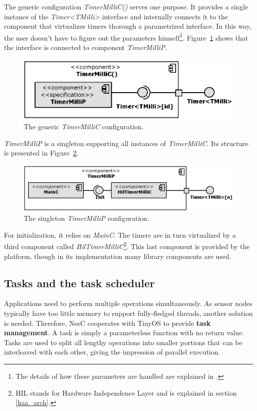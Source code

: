 The generic configuration \emph{TimerMilliC()} serves one purpose. It provides a single instance of the \emph{Timer<TMilli>} interface and internally connects it to the component that virtualizes timers thorough a parametrized interface. In this way, the user doesn't have to figure out the parameters himself\footnote{The details of how these parameters are handled are explained in \cite[ch. 6]{TOSProg}.}.  Figure~\ref{fig:timermillic} shows that the interface is connected to component \emph{TimerMilliP}.
\begin{figure}[h]
  \centering
  \includegraphics{diagrams/timermillic.eps}
  \caption{The generic \emph{TimerMilliC} configuration.}
  \label{fig:timermillic}
\end{figure}
\emph{TimerMilliP} is a singleton supporting all instances of \emph{TimerMilliC}. Its structure is presented in Figure~\ref{fig:timermillip}.
\begin{figure}[h]
  \centering
  \includegraphics{diagrams/timermillip.eps}
  \caption{The singleton \emph{TimerMilliP} configuration.}
  \label{fig:timermillip}
\end{figure}
For initialization, it relies on \emph{MainC}. The timers are in turn virtualized by a third component called \emph{HilTimerMilliC}\footnote{HIL stands for Hardware Independence Layer and is explained in section \ref{haa_arch}.}. This last component is provided by the platform, though in its implementation many library components are used.

\subsection{Tasks and the task scheduler}

Applications need to perform multiple operations simultaneously. As sensor nodes typically have too little memory to support fully-fledged threads, another solution is needed. Therefore, NesC cooperates with TinyOS to provide {\bf task management}. A task is simply a parameterless function with no return value. Tasks are used to split all lengthy operations into smaller portions that can be interleaved with each other, giving the impression of parallel execution. 


